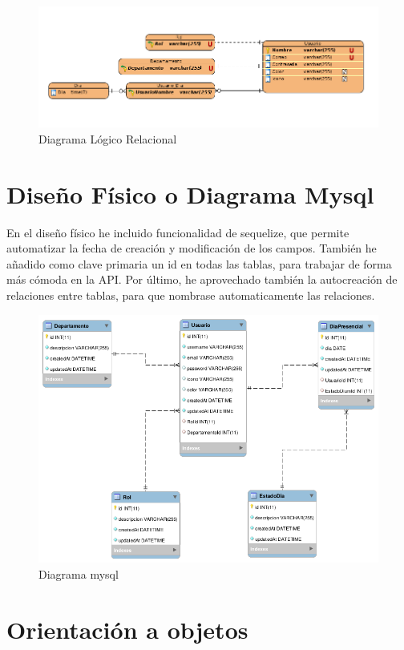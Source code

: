 \documentclass[11pt,spanish,listoffigures,listoftables]{tfgetsinf}
\begin{document}
\begin{figure}[h!] %
  \includegraphics[width=\linewidth]{img/pasotablas.png}
  \caption{Diagrama Lógico Relacional}
  \label{fig:diagramalr}
\end{figure}

\section{Diseño Físico o Diagrama Mysql}
En el diseño físico he incluido funcionalidad de sequelize, que permite automatizar la fecha de creación y modificación de los campos.
También he añadido como clave primaria un id en todas las tablas, para trabajar de forma más cómoda en la API.
Por último, he aprovechado también la autocreación de relaciones entre tablas, para que nombrase automaticamente las relaciones.
\begin{figure}[h!] %
   \includegraphics[width=\linewidth]{img/EsquemaBBDD.png}
   \caption{Diagrama mysql}
   \label{fig:diagramaMysql}
 \end{figure}

\section{Orientación a objetos}
\end{document}
